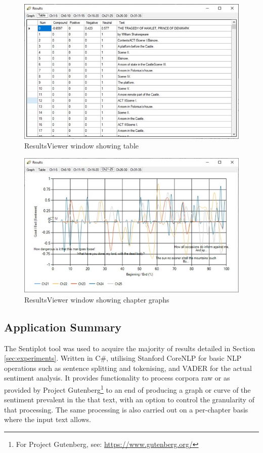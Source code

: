 \documentclass{article}
\begin{document}
{\begin{figure}[htbp]
            \includegraphics[width=1\textwidth]{Figures/Misc/resultstable}
            \caption{ResultsViewer window showing table}
            \label{fig:resultstable}
        \end{figure}
        \begin{figure}[htbp]
            \includegraphics[width=1\textwidth]{Figures/Misc/resultschapters}
            \caption{ResultsViewer window showing chapter graphs}
            \label{fig:resultschapters}
        \end{figure}
    \subsection{Application Summary}
        The Sentiplot tool was used to acquire the majority of results detailed in Section \ref{sec:experiments}. Written in C\#, utilising Stanford CoreNLP for basic NLP operations such as sentence splitting and tokenising, and VADER for the actual sentiment analysis. It provides functionality to process corpora raw or as provided by Project Gutenberg\footnote{For Project Gutenberg, see: \url{https://www.gutenberg.org/}} to an end of producing a graph or curve of the sentiment prevalent in the that text, with an option to control the granularity of that processing. The same processing is also carried out on a per-chapter basis where the input text allows.
\newpage
}
\end{document}
